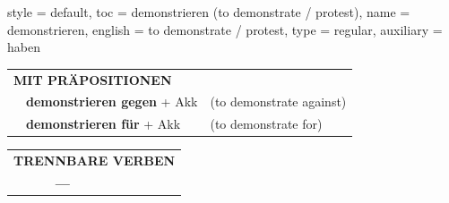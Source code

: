 \begin{verbentry}{
  style = {default},
  toc = {demonstrieren (to demonstrate / protest)},
  name = {demonstrieren},
  english = {to demonstrate / protest},
  type = {regular},
  auxiliary = {haben}
}
\vspace{10pt}

\begin{tabular}{lll}
\multicolumn{3}{l}{\textbf{MIT PRÄPOSITIONEN}}\\
& \textbf{demonstrieren gegen} + Akk & (to demonstrate against)\\
& \textbf{demonstrieren für} + Akk & (to demonstrate for)\\
\end{tabular}
\hfill
\begin{tabular}{lll}
\multicolumn{3}{l}{\textbf{TRENNBARE VERBEN}}\\
& \textbf{---} & \\
\end{tabular}

\vspace{-5pt}
\end{verbentry}

